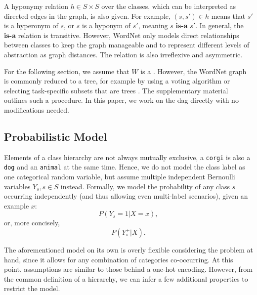\documentclass[10pt,twocolumn,letterpaper]{article}
\begin{document}
A hyponymy relation $h \in S \times S$ over the classes, which can be
interpreted as directed edges in the graph, is also given. For example, $(s,s')\in h$ means that
$s'$ is a hyperonym of $s$, or $s$ is a hyponym of $s'$, meaning $s$ \textbf{is-a} $s'$.
In general, the \textbf{is-a} relation is transitive. However, WordNet only models direct
relationships between classes to keep the graph manageable and to represent different
levels of abstraction as graph distances. The relation is also irreflexive and
asymmetric. 

For the following section, we assume that $W$ is a . However,
the WordNet graph is commonly reduced to a tree, for example by using a voting algorithm \cite{Torralba2008Tiny}
or selecting task-specific subsets that are trees \cite{Deng2009ImageNet}. The supplementary material
outlines such a procedure. In this paper, we work on the \gls{dag} directly with no modifications needed.

\subsection{Probabilistic Model}
Elements of a class hierarchy are not always mutually exclusive, \eg a \texttt{corgi} is also a \texttt{dog} and an \texttt{animal} at the same time.
Hence, we do not model the class label as one categorical random variable, but
assume multiple independent Bernoulli variables $Y_{s}, s \in S$ instead. 
Formally, we model the probability of any class $s$ occurring independently (and thus allowing even multi-label
scenarios), given an example $x$:
\begin{equation}
P(Y_{s}=1 | X=x),
\end{equation}
or, more concisely,
\begin{equation}
P(Y_s^+ | X).
\label{eqn:themodel}
\end{equation}

The aforementioned model on its own is overly flexible considering the problem at hand, since
it allows for any combination of categories co-occurring. At this point, assumptions are similar
to those behind a one-hot encoding.
However, from the common definition of a hierarchy, we can infer a few additional properties to restrict the model.
\end{document}
